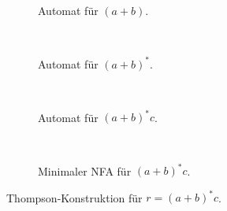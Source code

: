 \documentclass[11pt, a4paper]{article}
\theoremstyle{definition}
\theoremstyle{plain}
\numberwithin{equation}{section}
\begin{document}
\begin{figure}
	\centering
	\begin{subfigure}{.99\textwidth}
		\centering
		
		\caption{Automat für \( (a+b) \).}
		\label{fig:thompson_example_1}
	\end{subfigure}\\
	\begin{subfigure}{.99\textwidth}
		\centering
		
		\caption{Automat für \( (a+b)^\ast \).}
		\label{fig:thompson_example_2}
	\end{subfigure}\\
	\begin{subfigure}{.99\textwidth}
		\centering
		
		\caption{Automat für \( (a+b)^\ast c \).}
		\label{fig:thompson_example_3}
	\end{subfigure}\\
	\begin{subfigure}{.99\textwidth}
		\centering
		
		\caption{Minimaler NFA für \( (a+b)^\ast c \).}
		\label{fig:thompson_example_4}
	\end{subfigure}
	\caption{Thompson-Konstruktion für \( r = (a+b)^\ast c \).}
	\label{fig:thompson_example}
\end{figure}
\end{document}

